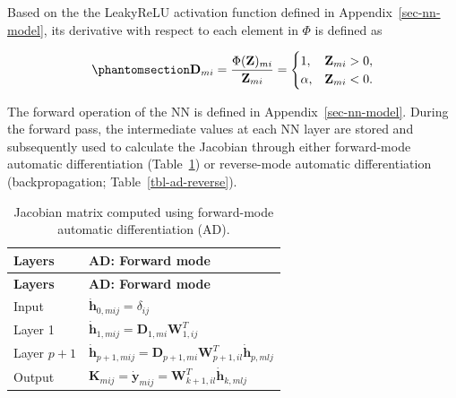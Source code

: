 \documentclass[
  11pt,
  letterpaper,
]{scrreprt}
\begin{document}
Based on the the LeakyReLU activation function defined in
Appendix~\ref{sec-nn-model}, its derivative with respect to each element
in \(\Phi\) is defined as

\begin{equation}\phantomsection\label{eq-D}{
\mathbf{D}_{mi}
=
\frac{\Phi(\mathbf{Z})_{mi}}
{\mathbf{Z}_{mi}}
=
\begin{cases}
1, & \mathbf{Z}_{mi}>0, \\
\alpha, & \mathbf{Z}_{mi}<0.
\end{cases}
}\end{equation}

The forward operation of the NN is defined in
Appendix~\ref{sec-nn-model}. During the forward pass, the intermediate
values at each NN layer are stored and subsequently used to calculate
the Jacobian through either forward-mode automatic differentiation
(Table~\ref{tbl-ad-forward}) or reverse-mode automatic differentiation
(backpropagation; Table~\ref{tbl-ad-reverse}).

\begin{longtable}[]{@{}
  >{\raggedright\arraybackslash}p{}
  >{\raggedright\arraybackslash}p{}@{}}
\caption{Jacobian matrix computed using forward-mode automatic
differentiation (AD).}\label{tbl-ad-forward}\tabularnewline
\toprule\noalign{}
\begin{minipage}[b]{\linewidth}\raggedright
\textbf{Layers}
\end{minipage} & \begin{minipage}[b]{\linewidth}\raggedright
\textbf{AD: Forward mode}
\end{minipage} \\
\midrule\noalign{}
\endfirsthead
\toprule\noalign{}
\begin{minipage}[b]{\linewidth}\raggedright
\textbf{Layers}
\end{minipage} & \begin{minipage}[b]{\linewidth}\raggedright
\textbf{AD: Forward mode}
\end{minipage} \\
\midrule\noalign{}
\endhead
\bottomrule\noalign{}
\endlastfoot
Input & \(\dot{\mathbf{h}}_{0,mij}=\delta_{ij}\) \\
Layer 1 &
\(\dot{\mathbf{h}}_{1,mij}=\mathbf{D}_{1,mi}\mathbf{W}_{1,ij}^T\) \\
Layer \(p+1\) &
\(\dot{\mathbf{h}}_{p+1,mij}=\mathbf{D}_{p+1,mi}\mathbf{W}_{p+1,il}^T\dot{\mathbf{h}}_{p,mlj}\) \\
Output &
\(\mathbf{K}_{mij}=\dot{\mathbf{y}}_{mij}=\mathbf{W}_{k+1,il}^T\dot{\mathbf{h}}_{k,mlj}\) \\
\end{longtable}
\end{document}
